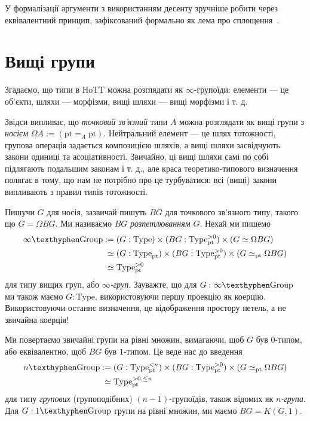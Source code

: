 \documentclass[12pt]{article}
\newcommand*{\Loop}{\Omega}
\newcommand*{\pt}{{\mathrm{pt}}}
\renewcommand*{\equiv}{\mathrel{\simeq}}
\newcommand*{\Type}{\mathrm{Type}}
\newcommand*{\Grp}{\mathrm{\texthyphen Group}}
\begin{document}
У формалізації аргументи з використанням десенту зручніше робити через еквівалентний принцип, зафіксований формально як лема про сплощення~\cite[\S6.12]{TheBook}.

\section{Вищі групи}
\label{sec:higher-groups}

Згадаємо, що типи в HoTT можна розглядати як $\infty$-групоїди: елементи — це об'єкти, шляхи — морфізми, вищі шляхи — вищі морфізми і т. д.

Звідси випливає, що \emph{точковий зв'язний} типи $A$ можна розглядати як вищі групи з \emph{носієм} $\Loop A := (\pt =_A \pt)$. Нейтральний елемент — це шлях тотожності, групова операція задається композицією шляхів, а вищі шляхи засвідчують закони одиниці та асоціативності. Звичайно, ці вищі шляхи самі по собі підлягають подальшим законам і т. д., але краса теоретико-типового визначення полягає в тому, що нам не потрібно про це турбуватися: всі (вищі) закони випливають з правил типів тотожності.

Пишучи $G$ для носія, зазвичай пишуть $BG$ для точкового зв'язного типу, такого що $G = \Loop BG$. Ми називаємо $BG$ \emph{розпетлюванням} $G$. Нехай ми пишемо
\begin{align*}
  \infty\Grp
  &:= (G : \Type) \times (BG : \Type_\pt^{>0}) \times (G \equiv \Loop BG) \\
  &\phantom{:}\equiv (G : \Type_\pt) \times (BG : \Type_\pt^{>0}) \times (G \equiv_\pt \Loop BG) \\
  &\phantom{:}\equiv \Type_\pt^{>0}
\end{align*}
для типу вищих груп, або \emph{$\infty$-груп}. Зауважте, що для $G : \infty\Grp$ ми також маємо $G : \Type$, використовуючи першу проекцію як коерцію. Використовуючи останнє визначення, це відображення простору петель, а не звичайна коерція!

Ми повертаємо звичайні групи на рівні множин, вимагаючи, щоб $G$ був $0$-типом, або еквівалентно, щоб $BG$ був $1$-типом. Це веде нас до введення
\begin{align*}
  n\Grp
  &:= (G : \Type_\pt^{<n}) \times (BG : \Type_\pt^{>0})
    \times (G \equiv_\pt \Loop BG) \\
  &\phantom{:}\equiv \Type_\pt^{>0,\le n}
\end{align*}
для типу \emph{групових} (групоподібних) $(n-1)$-групоїдів, також відомих як \emph{$n$-групи}. Для $G : 1\Grp$ групи на рівні множин, ми маємо $BG = K(G,1)$.
\end{document}
